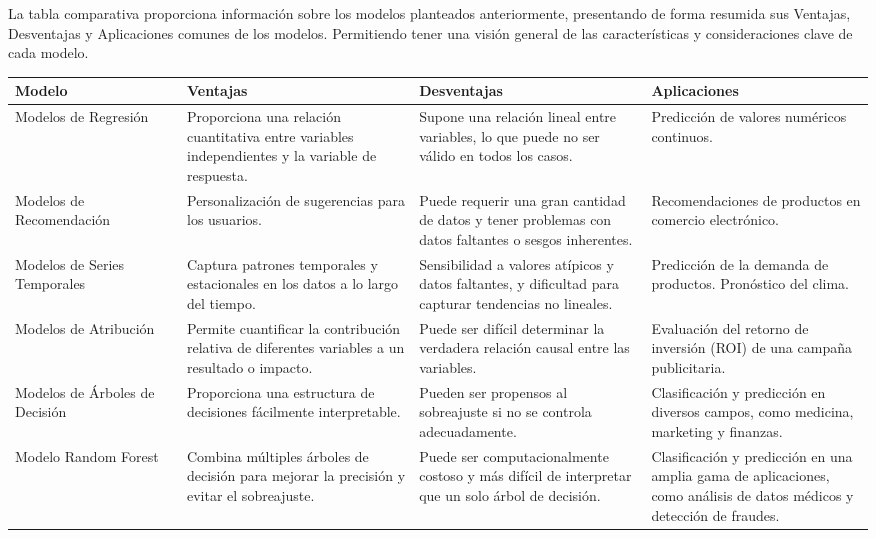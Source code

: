 La tabla comparativa proporciona información sobre los modelos planteados anteriormente, presentando de forma resumida sus Ventajas, Desventajas y Aplicaciones comunes de los modelos. Permitiendo tener una visión general de las características y consideraciones clave de cada modelo.

\begin{table}[ht]
\captionsetup{font=small} %
\small %
\begin{tabular}{|p{0.2\linewidth}|p{0.27\linewidth}|p{0.27\linewidth}|p{0.26\linewidth}|}
\hline
\textbf{Modelo} & \textbf{Ventajas} & \textbf{Desventajas} & \textbf{Aplicaciones} \\
\hline
Modelos de Regresión & 
Proporciona una relación cuantitativa entre variables independientes y la variable de respuesta. & 
Supone una relación lineal entre variables, lo que puede no ser válido en todos los casos. & 
Predicción de valores numéricos continuos. \\
\hline
Modelos de Recomendación & 
Personalización de sugerencias para los usuarios. & 
Puede requerir una gran cantidad de datos y tener problemas con datos faltantes o sesgos inherentes. & 
Recomendaciones de productos en comercio electrónico. \\
\hline
Modelos de Series Temporales & 
Captura patrones temporales y estacionales en los datos a lo largo del tiempo. & 
Sensibilidad a valores atípicos y datos faltantes, y dificultad para capturar tendencias no lineales. & 
Predicción de la demanda de productos. Pronóstico del clima. \\
\hline
Modelos de Atribución & 
Permite cuantificar la contribución relativa de diferentes variables a un resultado o impacto. & 
Puede ser difícil determinar la verdadera relación causal entre las variables. & 
Evaluación del retorno de inversión (ROI) de una campaña publicitaria. \\
\hline
Modelos de Árboles de Decisión & 
Proporciona una estructura de decisiones fácilmente interpretable. & 
Pueden ser propensos al sobreajuste si no se controla adecuadamente. & 
Clasificación y predicción en diversos campos, como medicina, marketing y finanzas. \\
\hline
Modelo Random Forest & 
Combina múltiples árboles de decisión para mejorar la precisión y evitar el sobreajuste. & 
Puede ser computacionalmente costoso y más difícil de interpretar que un solo árbol de decisión. & 
Clasificación y predicción en una amplia gama de aplicaciones, como análisis de datos médicos y detección de fraudes. \\
\hline
\end{tabular}
\end{table}
